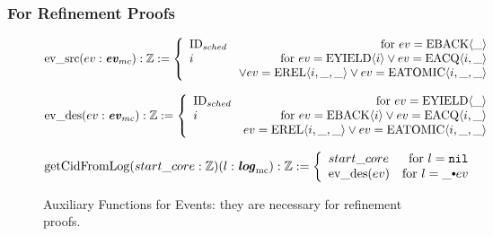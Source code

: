 \subsubsection{For Refinement Proofs}


\begin{figure}

%
%

$
{\mathrm{ev}\_\mathrm{src}} (ev : {\mathrm{\textbf{\textit{ev}}}_{mc}}) : {\mathbb{Z}} := 
 \left\{\begin{array}{lr}
{\mathrm{ID}_{sched}} & \text{for } ev = {{\mathrm{EBACK}}\langle{\_}\rangle} \\
i  & \text{for } ev ={{\mathrm{EYIELD}}\langle{i}\rangle}  \vee ev= {{\mathrm{EACQ}}\langle{i}, {\_}\rangle} \\
   & \vee ev = {{\mathrm{EREL}}\langle{i}, {\_}, {\_}\rangle} \vee ev =  {{\mathrm{EATOMIC}}\langle{i}, {\_}, {\_}\rangle}\\
\end{array} \right.
$

%
%

$
{\mathrm{ev}\_\mathrm{des}} (ev : {\mathrm{\textbf{\textit{ev}}}_{mc}}) : {\mathbb{Z}} := 
 \left\{\begin{array}{lr}
{\mathrm{ID}_{sched}} & \text{for } ev ={{\mathrm{EYIELD}}\langle{\_}\rangle} \\
i & \text{for } ev= {{\mathrm{EBACK}}\langle{i}\rangle} \vee ev = {{\mathrm{EACQ}}\langle{i}, {\_}\rangle}\\
   & ev=  {{\mathrm{EREL}}\langle{i}, {\_}, {\_}\rangle} \vee ev = {{\mathrm{EATOMIC}}\langle{i}, {\_}, {\_}\rangle}\\
\end{array} \right.
$

%
%

$
\getcuridfromlogkwd (start\_core : \ztype) (l : \mclog): \ztype :=
 \left\{\begin{array}{lr}
start\_core & \text{for }  l = \nulllist \\
\eventdesfuncnoeq{ev} & \text{for } l = \listconsoppo{ev}{\_}\\
\end{array} \right.
$

\caption{Auxiliary Functions for Events: they are necessary for refinement proofs.}
\label{fig:chapter:conlink:auxiliary-functions-for-events-in-refinement}
\end{figure}


